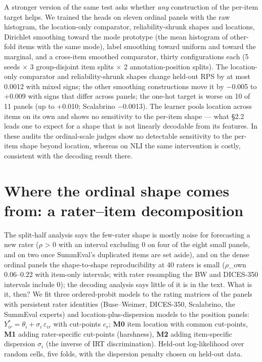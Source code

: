 \documentclass[10pt]{article}
\begin{document}
A stronger version of the same test asks whether \emph{any} construction of the per-item target helps. We trained the heads on eleven ordinal panels with the raw histogram, the location-only comparator, reliability-shrunk shapes and locations, Dirichlet smoothing toward the mode prototype (the mean histogram of other-fold items with the same mode), label smoothing toward uniform and toward the marginal, and a cross-item smoothed comparator, thirty configurations each (5 seeds $\times$ 3 group-disjoint item splits $\times$ 2 annotation-position splits). The location-only comparator and reliability-shrunk shapes change held-out RPS by at most 0.0012 with mixed signs; the other smoothing constructions move it by $-$0.005 to +0.009 with signs that differ across panels; the one-hot target is worse on 10 of 11 panels (up to +0.010; Scalabrino $-$0.0013). The learner pools location across items on its own and shows no sensitivity to the per-item shape --- what \S{}2.2 leads one to expect for a shape that is not linearly decodable from its features. In these audits the ordinal-scale judges show no detectable sensitivity to the per-item shape beyond location, whereas on NLI the same intervention is costly, consistent with the decoding result there.

\section{Where the ordinal shape comes from: a rater--item decomposition}



The split-half analysis says the few-rater shape is mostly noise for forecasting a new rater ($\rho$ \textgreater{} 0 with an interval excluding 0 on four of the eight small panels, and on two once SummEval's duplicated items are set aside), and on the dense ordinal panels the shape-to-shape reproducibility at 40 raters is small ($\rho$\_own 0.06--0.22 with item-only intervals; with rater resampling the BW and DICES-350 intervals include 0); the decoding analysis says little of it is in the text. What is it, then? We fit three ordered-probit models to the rating matrices of the panels with persistent rater identities (Buse--Weimer, DICES-350, Scalabrino, the SummEval experts) and location-plus-dispersion models to the position panels: \(Y^*_{ir} = \theta_i + \sigma_i\,\varepsilon_{ir}\) with cut-points \(c_{r}\); \textbf{M0} item location with common cut-points, \textbf{M1} adding rater-specific cut-points (harshness), \textbf{M2} adding item-specific dispersion \(\sigma_i\) (the inverse of IRT discrimination). Held-out log-likelihood over random cells, five folds, with the dispersion penalty chosen on held-out data.
\end{document}
